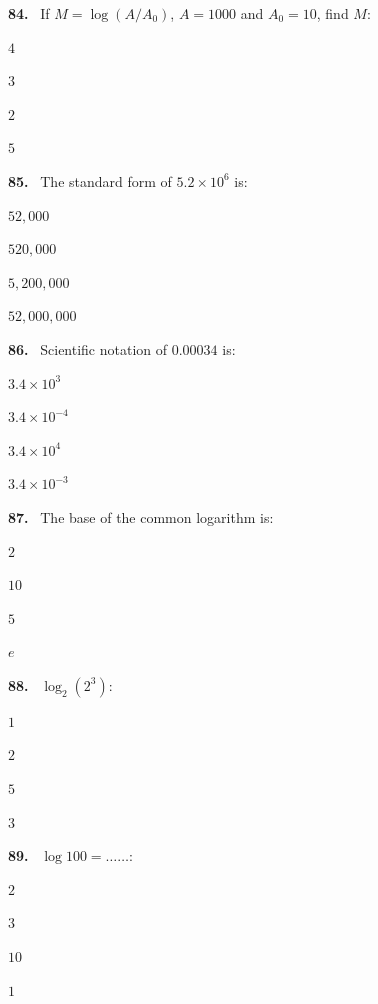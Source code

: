 \documentclass[11pt]{article}
\newenvironment{qenv}[1]{%
  \par\medskip\noindent\textbf{#1.}\ \ignorespaces
}{\par}
\begin{document}
\begin{qenv}{84} If $M=\log(A/A_0)$, $A=1000$ and $A_0=10$, find $M$:
\begin{options} \item $4$ \item $3$ \item $2$ \item $5$ \end{options} \end{qenv}

\begin{qenv}{85} The standard form of $5.2\times10^6$ is:
\begin{options} \item $52{,}000$ \item $520{,}000$ \item $5{,}200{,}000$ \item $52{,}000{,}000$ \end{options} \end{qenv}

\begin{qenv}{86} Scientific notation of $0.00034$ is:
\begin{options} \item $3.4\times10^3$ \item $3.4\times10^{-4}$ \item $3.4\times10^4$ \item $3.4\times10^{-3}$ \end{options} \end{qenv}

\begin{qenv}{87} The base of the common logarithm is:
\begin{options} \item $2$ \item $10$ \item $5$ \item $e$ \end{options} \end{qenv}

\begin{qenv}{88} $\log_2(2^3)$:
\begin{options} \item $1$ \item $2$ \item $5$ \item $3$ \end{options} \end{qenv}

\begin{qenv}{89} $\log 100 = \ldots\ldots$:
\begin{options} \item $2$ \item $3$ \item $10$ \item $1$ \end{options} \end{qenv}
\end{document}
